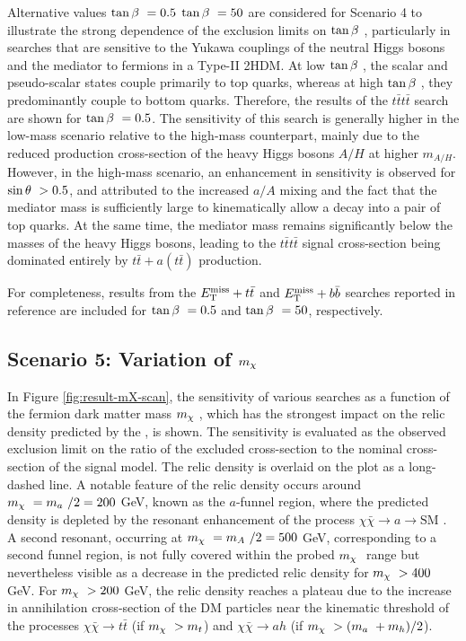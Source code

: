 Alternative values $\tan\beta~=0.5$ $\tan\beta~=50$ are considered for Scenario 4 to illustrate the strong dependence of the exclusion limits on $\tan\beta~$, particularly in searches that are sensitive to the Yukawa couplings of the neutral Higgs bosons and the mediator to fermions in a Type-II 2HDM. At low $\tan\beta~$, the scalar and pseudo-scalar states couple primarily to top quarks, whereas at high $\tan\beta~$, they predominantly couple to bottom quarks. Therefore, the results of the $t\bar{t}t\bar{t}$ search are shown for $\tan\beta~=0.5$. The sensitivity of this search is generally higher in the low-mass scenario relative to the high-mass counterpart, mainly due to the reduced production cross-section of the heavy Higgs bosons $A/H$ at higher $m_{A/H}$. However, in the high-mass scenario, an enhancement in sensitivity is observed for $\sin\theta~ > 0.5$, and attributed to the increased $a/A$ mixing and the fact that the mediator mass is sufficiently large to kinematically allow a decay into a pair of top quarks. At the same time, the mediator mass remains significantly below the masses of the heavy Higgs bosons, leading to the $t\bar{t}t\bar{t}$ signal cross-section being dominated entirely by $t\bar{t} + a (t\bar{t})$ production. 

For completeness, results from the $E_{\mathrm{T}}^{\mathrm{miss}}+t\bar{t}$ and $E_{\mathrm{T}}^{\mathrm{miss}}+b\bar{b}$ searches reported in reference \cite{EXOT-2017-32} are included for $\tan\beta~=0.5$ and $\tan\beta~=50$, respectively.

\subsection{Scenario 5: Variation of \texorpdfstring{$m_{\chi}~$}{TEXT}}

In Figure \ref{fig:result-mX-scan}, the sensitivity of various searches as a function of the fermion dark matter mass $m_{\chi}~$, which has the strongest impact on the relic density predicted by the \hdma, is shown. 
The sensitivity is evaluated as the observed exclusion limit on the ratio of the excluded cross-section to the nominal cross-section of the signal model. The relic density is overlaid on the plot as a long-dashed line. A notable feature of the relic density occurs around $m_{\chi}~=m_a~/2=200$ GeV, known as the $a$-funnel region, where the predicted density is depleted by the resonant enhancement of the process $\chi\bar{\chi}\rightarrow a\rightarrow \mathrm{SM}$ \cite{Djouadi:2005dz,Bagnaschi:2015eha,2HDMWGproxi}. A second resonant, occurring at $m_{\chi}~=m_A~/2=500$ GeV, corresponding to a second funnel region, is not fully covered within the probed $m_{\chi}~$ range but nevertheless visible as a decrease in the predicted relic density for $m_{\chi}~ >400$ GeV. For $m_{\chi}~ >200$ GeV, the relic density reaches a plateau due to the increase in annihilation cross-section of the DM particles near the kinematic threshold of the processes $\chi\bar{\chi}\rightarrow t\bar{t}$ (if $m_{\chi}~ > m_t$) and $\chi\bar{\chi}\rightarrow ah$ (if $m_{\chi}~ > (m_a~+m_h)/2$). 

